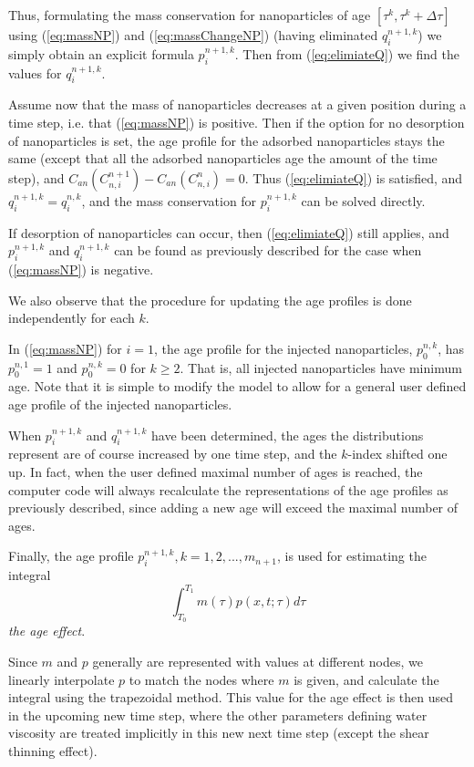 Thus, formulating the mass conservation for nanoparticles of age $\left[\tau^k, \tau^k+\Delta\tau\right]$ using (\ref{eq:massNP}) and (\ref{eq:massChangeNP}) (having eliminated  $q_i^{n+1,k}$) we simply obtain an explicit formula $p_i^{n+1,k}$. Then from (\ref{eq:elimiateQ}) we find the values for $q_i^{n+1,k}$.

Assume now that the mass of nanoparticles decreases at a given position during a time step, i.e. that (\ref{eq:massNP}) is positive. Then if the option for no desorption of nanoparticles is set, the age profile for the adsorbed nanoparticles stays the same (except that all the adsorbed nanoparticles age the amount of the time step), and $C_{an}(C_{n,i}^{n+1})- C_{an}(C_{n,i}^{n})=0$. Thus (\ref{eq:elimiateQ}) is satisfied, and $q_i^{n+1,k}=q_i^{n,k}$, and the mass conservation for $p_i^{n+1,k}$ can be solved directly.

If desorption of nanoparticles can occur, then (\ref{eq:elimiateQ}) still applies, and $p_i^{n+1,k}$ and  $q_i^{n+1,k}$ can be found as previously described for the case when (\ref{eq:massNP}) is negative. 

We also observe that the procedure for updating the age profiles is done independently for each $k$.

In (\ref{eq:massNP}) for $i=1$, the age profile for the injected nanoparticles, $p_0^{n,k}$, has $p_0^{n,1}=1$ and $p_0^{n,k}=0$ for $k\geq2$. That is, all injected nanoparticles have minimum age. Note that it is simple to modify the model to allow for a general user defined age profile of the injected nanoparticles.

When $p_i^{n+1,k}$ and $q_i^{n+1,k}$ have been determined, the ages the distributions represent are of course increased by one time step, and the  $k$-index shifted one up. In fact, when the user defined maximal number of ages is reached, the computer code will always recalculate the representations of the age profiles as previously described, since adding a new age will exceed the maximal number of ages.

Finally, the age profile $p_i^{n+1,k},k=1,2,...,m_{n+1}$,  is used for estimating the integral
\begin{equation}
    \int_{T_0}^{T_1} m(\tau)p(x,t;\tau)d\tau
\end{equation}
\textit{the age effect}.

Since $m$ and $p$ generally are represented with values at different nodes, we linearly interpolate $p$ to match the nodes where $m$ is given, and calculate the integral using the trapezoidal method. This value for the age effect is then used in the upcoming new time step, where the other parameters defining water viscosity are treated implicitly in this new next time step (except the shear thinning effect).

